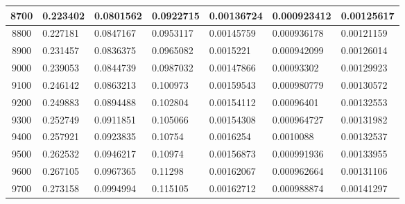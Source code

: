 \documentclass[11pt,spanish]{article} %
\begin{document}
\begin{center}
\begin{longtable}{|c|l|l|l|l|l|l|}
8700 & 0.223402                     & 0.0801562                      & 0.0922715                      & 0.00136724                     & 0.000923412                    & 0.00125617                    \\ \hline
8800 & 0.227181                     & 0.0847167                      & 0.0953117                      & 0.00145759                     & 0.000936178                    & 0.00121159                    \\ \hline
8900 & 0.231457                     & 0.0836375                      & 0.0965082                      & 0.0015221                      & 0.000942099                    & 0.00126014                    \\ \hline
9000 & 0.239053                     & 0.0844739                      & 0.0987032                      & 0.00147866                     & 0.00093302                     & 0.00129923                    \\ \hline
9100 & 0.246142                     & 0.0863213                      & 0.100973                       & 0.00159543                     & 0.000980779                    & 0.00130572                    \\ \hline
9200 & 0.249883                     & 0.0894488                      & 0.102804                       & 0.00154112                     & 0.00096401                     & 0.00132553                    \\ \hline
9300 & 0.252749                     & 0.0911851                      & 0.105066                       & 0.00154308                     & 0.000964727                    & 0.00131982                    \\ \hline
9400 & 0.257921                     & 0.0923835                      & 0.10754                        & 0.0016254                      & 0.0010088                      & 0.00132537                    \\ \hline
9500 & 0.262532                     & 0.0946217                      & 0.10974                        & 0.00156873                     & 0.000991936                    & 0.00133955                    \\ \hline
9600 & 0.267105                     & 0.0967365                      & 0.11298                        & 0.00162067                     & 0.000962664                    & 0.00131106                    \\ \hline
9700 & 0.273158                     & 0.0994994                      & 0.115105                       & 0.00162712                     & 0.000988874                    & 0.00141297                    \\ \hline

\end{longtable}
\end{center}
\end{document}

